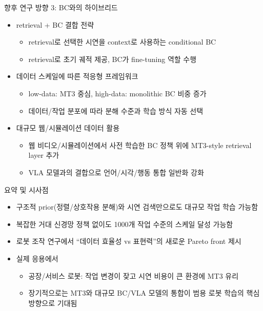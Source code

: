 \documentclass[aspectratio=169]{beamer}
\begin{document}
\begin{frame}{향후 연구 방향 3: BC와의 하이브리드}
  \small
  \begin{itemize}
    \item retrieval + BC 결합 전략
    \begin{itemize}
      \item retrieval로 선택한 시연을 context로 사용하는 conditional BC
      \item retrieval로 초기 궤적 제공, BC가 fine-tuning 역할 수행
    \end{itemize}
    \item 데이터 스케일에 따른 적응형 프레임워크
    \begin{itemize}
      \item low-data: MT3 중심, high-data: monolithic BC 비중 증가
      \item 데이터/작업 분포에 따라 분해 수준과 학습 방식 자동 선택
    \end{itemize}
    \item 대규모 웹/시뮬레이션 데이터 활용
    \begin{itemize}
      \item 웹 비디오/시뮬레이션에서 사전 학습한 BC 정책 위에 MT3-style retrieval layer 추가
      \item VLA 모델과의 결합으로 언어/시각/행동 통합 일반화 강화
    \end{itemize}
  \end{itemize}
\end{frame}

\begin{frame}{요약 및 시사점}
  \small
  \begin{itemize}
    \item 구조적 prior(정렬/상호작용 분해)와 시연 검색만으로도 대규모 작업 학습 가능함
    \item 복잡한 거대 신경망 정책 없이도 1000개 작업 수준의 스케일 달성 가능함
    \item 로봇 조작 연구에서 ``데이터 효율성 vs 표현력''의 새로운 Pareto front 제시
    \item 실제 응용에서
    \begin{itemize}
      \item 공장/서비스 로봇: 작업 변경이 잦고 시연 비용이 큰 환경에 MT3 유리
      \item 장기적으로는 MT3와 대규모 BC/VLA 모델의 통합이 범용 로봇 학습의 핵심 방향으로 기대됨
    \end{itemize}
  \end{itemize}
\end{frame}

\end{document}
